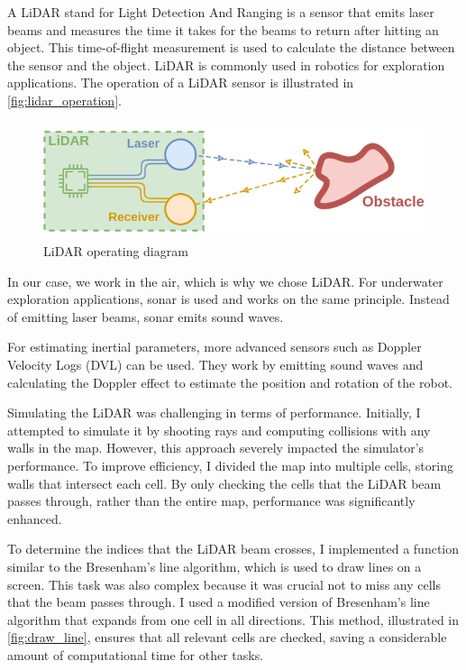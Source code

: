\documentclass[../main.tex]{subfiles}
\begin{document}
A LiDAR stand for Light Detection And Ranging is a sensor that emits laser beams and measures the time it takes for the beams to return after hitting an object. This time-of-flight measurement is used to calculate the distance between the sensor and the object. LiDAR is commonly used in robotics for exploration applications. The operation of a LiDAR sensor is illustrated in \autoref{fig:lidar_operation}.

\begin{figure}[H]
	\centering
	\includegraphics[width=0.6\linewidth]{IMAGES/part5/lidar_operation_scheme.png}
	\caption{LiDAR operating diagram}
	\label{fig:lidar_operation}
\end{figure}

In our case, we work in the air, which is why we chose LiDAR. For underwater exploration applications, sonar is used and works on the same principle. Instead of emitting laser beams, sonar emits sound waves. 

\vspace{0.5em}

For estimating inertial parameters, more advanced sensors such as Doppler Velocity Logs (DVL) can be used. They work by emitting sound waves and calculating the Doppler effect to estimate the position and rotation of the robot.

\vspace{1em}

Simulating the LiDAR was challenging in terms of performance. Initially, I attempted to simulate it by shooting rays and computing collisions with any walls in the map. However, this approach severely impacted the simulator's performance. To improve efficiency, I divided the map into multiple cells, storing walls that intersect each cell. By only checking the cells that the LiDAR beam passes through, rather than the entire map, performance was significantly enhanced.

\vspace{1em}

To determine the indices that the LiDAR beam crosses, I implemented a function similar to the Bresenham's line algorithm, which is used to draw lines on a screen. This task was also complex because it was crucial not to miss any cells that the beam passes through. I used a modified version of Bresenham's line algorithm that expands from one cell in all directions. This method, illustrated in \autoref{fig:draw_line}, ensures that all relevant cells are checked, saving a considerable amount of computational time for other tasks.\cite{bresenham_wiki_2025}
\end{document}
